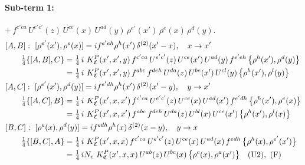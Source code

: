 \documentclass[10pt]{article}
\numberwithin{equation}{section}
\begin{document}
\paragraph{Sub-term 1:} $+\,f^{c'ca}\,U^{e'c'}(z)\,U^{ce}(x)\,U^{ad}(y)\,\rho^{e'}(x')\,\rho^{e}(x)\,\rho^{d}(y)$.
\begin{align}
&[A,B]:\ [\rho^{e'}(x'),\rho^{e}(x)]=i f^{e'eh}\rho^{h}(x')\,\delta^{(2)}(x'-x),\quad x\to x'\notag\\
&\qquad \tfrac14\{[A,B],C\}=\tfrac14\,i\,\,K^{P}_{\mathfrak C}(x',x',y)\,f^{c'ca}\,U^{e'c'}(z)\,U^{ce}(x')\,U^{ad}(y)\,f^{e'eh}\,\big\{\rho^{h}(x'),\rho^{d}(y)\big\}\notag\\
&\qquad\phantom{\tfrac14\{[A,B],C\}}=\tfrac14\,i\,\,K^{P}_{\mathfrak C}(x',x',y)\,f^{abc}\,f^{deh}\,U^{da}(z)\,U^{be}(x')\,U^{cl}(y)\,\big\{\rho^{h}(x'),\rho^{l}(y)\big\}
\label{B:eq:GIII.V.P-1-AB}\\
&[A,C]:\ [\rho^{e'}(x'),\rho^{d}(y)]=i f^{e'dh}\rho^{h}(x')\,\delta^{(2)}(x'-y),\quad y\to x'\notag\\
&\qquad \tfrac14\{[A,C],B\}=\tfrac14\,i\,\,K^{P}_{\mathfrak C}(x',x,x')\,f^{c'ca}\,U^{e'c'}(z)\,U^{ce}(x)\,U^{ad}(x')\,f^{e'dh}\,\big\{\rho^{h}(x'),\rho^{e}(x)\big\}\notag\\
&\qquad\phantom{\tfrac14\{[A,C],B\}}=\tfrac14\,i\,\,K^{P}_{\mathfrak C}(x',x,x')\,f^{abc}\,f^{deh}\,U^{da}(z)\,U^{bl}(x)\,U^{ce}(x')\,\big\{\rho^{h}(x'),\rho^{l}(x)\big\}
\label{B:eq:GIII.V.P-1-AC}\\
&[B,C]:\ [\rho^{e}(x),\rho^{d}(y)]=i f^{edh}\rho^{h}(x)\,\delta^{(2)}(x-y),\quad y\to x\notag\\
&\qquad \tfrac14\{[B,C],A\}=\tfrac14\,i\,\,K^{P}_{\mathfrak C}(x',x,x)\,f^{c'ca}\,U^{e'c'}(z)\,U^{ce}(x)\,U^{ad}(x)\,f^{edh}\,\big\{\rho^{h}(x),\rho^{e'}(x')\big\}\notag\\
&\qquad\phantom{\tfrac14\{[B,C],A\}}=\tfrac14\,i N_{c}\,\,K^{P}_{\mathfrak C}(x',x,x)\,U^{ab}(z)\,U^{bc}(x)\,\big\{\rho^{c}(x),\rho^{a}(x')\big\}\quad\text{(U2)},\ \text{(F)}
\label{B:eq:GIII.V.P-1-BC}
\end{align}
\end{document}
